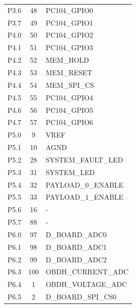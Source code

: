 \begin{longtable}{lcL{10cm}}
    P3.6              & 48                  & PC104\_GPIO0          \\
    P3.7              & 49                  & PC104\_GPIO1          \\
    \midrule
    P4.0              & 50                  & PC104\_GPIO2          \\
    P4.1              & 51                  & PC104\_GPIO3          \\
    P4.2              & 52                  & MEM\_HOLD             \\
    P4.3              & 53                  & MEM\_RESET            \\
    P4.4              & 54                  & MEM\_SPI\_CS          \\
    P4.5              & 55                  & PC104\_GPIO4          \\
    P4.6              & 56                  & PC104\_GPIO5          \\
    P4.7              & 57                  & PC104\_GPIO6          \\
    \midrule
    P5.0              & 9                   & VREF                  \\
    P5.1              & 10                  & AGND                  \\
    P5.2              & 28                  & SYSTEM\_FAULT\_LED    \\
    P5.3              & 31                  & SYSTEM\_LED           \\
    P5.4              & 32                  & PAYLOAD\_0\_ENABLE    \\
    P5.5              & 33                  & PAYLOAD\_1\_ENABLE    \\
    P5.6              & 16                  & -                     \\
    P5.7              & 88                  & -                     \\
    \midrule
    P6.0              & 97                  & D\_BOARD\_ADC0        \\
    P6.1              & 98                  & D\_BOARD\_ADC1        \\
    P6.2              & 99                  & D\_BOARD\_ADC2        \\
    P6.3              & 100                 & OBDH\_CURRENT\_ADC    \\
    P6.4              & 1                   & OBDH\_VOLTAGE\_ADC    \\
    P6.5              & 2                   & D\_BOARD\_SPI\_CS0    \\

\end{longtable}
